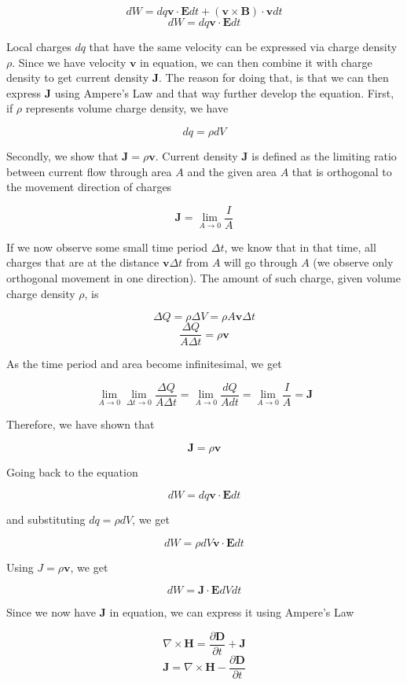 \documentclass{article}
\begin{document}
\[ dW = dq\mathbf{v}\cdot\mathbf{E}dt + (\mathbf{v} \times \mathbf{B}) \cdot \mathbf{v}dt \]
\[ dW = dq\mathbf{v}\cdot\mathbf{E}dt \]

Local charges $dq$ that have the same velocity can be expressed via charge density $\rho$. Since we have velocity $\mathbf{v}$ in equation, we can then combine it with charge density to get current density $\mathbf{J}$. The reason for doing that, is that we can then express $\mathbf{J}$ using Ampere's Law and that way further develop the equation. First, if $\rho$ represents volume charge density, we have

\[ dq = \rho dV \]

Secondly, we show that $\mathbf{J} = \rho\mathbf{v}$. Current density $\mathbf{J}$ is defined as the limiting ratio between current flow through area $A$ and the given area $A$ that is orthogonal to the movement direction of charges

\[ \mathbf{J} = \lim_{A \to 0} \frac{I}{A} \]

If we now observe some small time period $\Delta t$, we know that in that time, all charges that are at the distance $\mathbf{v} \Delta t$ from $A$ will go through $A$ (we observe only orthogonal movement in one direction). The amount of such charge, given volume charge density $\rho$, is

\[ \Delta Q = \rho \Delta V = \rho A \mathbf{v}\Delta t \]
\[ \frac{\Delta Q}{A \Delta t} = \rho\mathbf{v} \]

As the time period and area become infinitesimal, we get

\[ \lim_{A \to 0} \lim_{\Delta t \to 0} \frac{\Delta Q}{A \Delta t} = \lim_{A \to 0} \frac{dQ}{Adt} = \lim_{A \to 0} \frac{I}{A} = \mathbf{J} \]

Therefore, we have shown that

\[ \mathbf{J} = \rho\mathbf{v} \]

Going back to the equation

\[ dW = dq\mathbf{v}\cdot\mathbf{E}dt \]

and substituting $dq = \rho dV$, we get

\[ dW = \rho dV \mathbf{v}\cdot\mathbf{E}dt \]

Using $J = \rho \mathbf{v}$, we get

\[ dW = \mathbf{J} \cdot \mathbf{E} dVdt \]

Since we now have $\mathbf{J}$ in equation, we can express it using Ampere's Law

\[ \nabla \times \mathbf{H} = \frac{\partial\mathbf{D}}{\partial t} + \mathbf{J} \]
\[ \mathbf{J} = \nabla \times \mathbf{H} - \frac{\partial\mathbf{D}}{\partial t} \]
\end{document}

